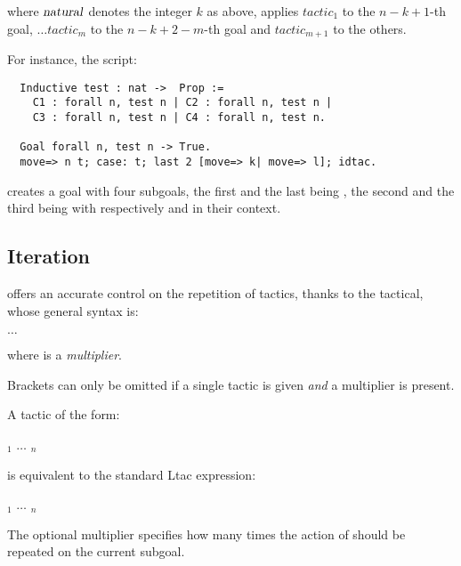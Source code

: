 where ${\textrm{\textsl{natural}}}$ denotes the integer $k$ as above, applies $tactic_1$ to the
$n -k + 1$-th goal, $\dots tactic_m$ to the $n -k + 2 - m$-th
goal and $tactic_{m+1}$ to the others.

For instance, the script:
\begin{lstlisting}
  Inductive test : nat ->  Prop :=
    C1 : forall n, test n | C2 : forall n, test n |
    C3 : forall n, test n | C4 : forall n, test n.

  Goal forall n, test n -> True.
  move=> n t; case: t; last 2 [move=> k| move=> l]; idtac.
\end{lstlisting}

creates a goal with four subgoals, the first and the last being
, the second and the third being  with
respectively  and  in their context.

\subsection{Iteration}\label{ssec:iter}

\ssr{} offers an accurate control on the repetition of
tactics, thanks to the  tactical, whose general syntax is:

\begin{center}
	  \ssrC{[}  \ssrC{|} $\dots$ \ssrC{|}  \ssrC{]}
\end{center}
where  is a \emph{multiplier}.

Brackets can only be omitted if a single tactic is given \emph{and} a
multiplier is present.

A tactic of the form:

\begin{center}
  \ssrC{do [} \tac$_1$ \ssrC{|} $\dots$ \ssrC{|} \tac$_n$\ssrC{].}
\end{center}

is equivalent to the standard Ltac expression:

\begin{center}
  \ssrC{first [} \tac$_1$ \ssrC{|} $\dots$ \ssrC{|} \tac$_n$\ssrC{].}
\end{center}


The optional multiplier  specifies how many times
the action of {\tac} should be repeated on the current subgoal.

